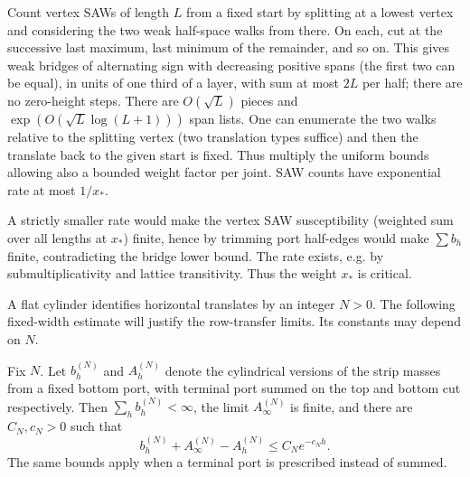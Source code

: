 Count vertex SAWs of length \(L\) from a fixed start by splitting at a lowest vertex and considering the two weak half-space walks from there. On each, cut at the successive last maximum, last minimum of the remainder, and so on. This gives weak bridges of alternating sign with decreasing positive spans (the first two can be equal), in units of one third of a layer, with sum at most \(2L\) per half; there are no zero-height steps. There are \(O(\sqrt L)\) pieces and \(\exp(O(\sqrt L\log(L+1)))\) span lists. One can enumerate the two walks relative to the splitting vertex (two translation types suffice) and then the translate back to the given start is fixed. Thus multiply the uniform bounds allowing also a bounded weight factor per joint. SAW counts have exponential rate at most \(1/x_*\).

A strictly smaller rate would make the vertex SAW susceptibility (weighted sum over all lengths at \(x_*\)) finite, hence by trimming port half-edges would make \(\sum b_h\) finite, contradicting the bridge lower bound. The rate exists, e.g. by submultiplicativity and lattice transitivity. Thus the weight \(x_*\) is critical.

A flat cylinder identifies horizontal translates by an integer \(N>0\). The following fixed-width estimate will justify the row-transfer limits. Its constants may depend on \(N\).

\begin{lemma}\label{lem:pv:cylinder-decay}
Fix \(N\). Let \(b_h^{(N)}\) and \(A_h^{(N)}\) denote the cylindrical versions of the strip masses from a fixed bottom port, with terminal port summed on the top and bottom cut respectively. Then \(\sum_h b_h^{(N)}<\infty\), the limit \(A_\infty^{(N)}\) is finite, and there are \(C_N,c_N>0\) such that
\[
 b_h^{(N)}+A_\infty^{(N)}-A_h^{(N)}
 \le C_N e^{-c_N h}.
\]
The same bounds apply when a terminal port is prescribed instead of summed.
\end{lemma}

